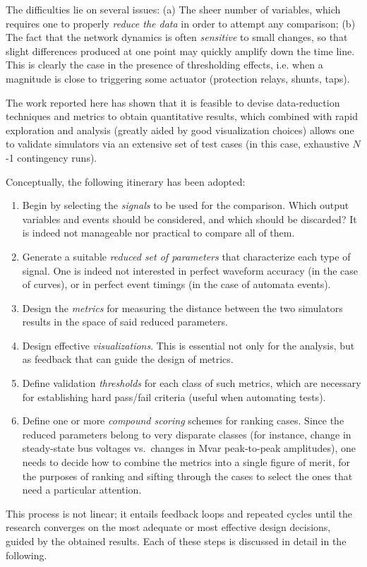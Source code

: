 \documentclass[conference]{IEEEtran}
\begin{document}
The difficulties lie on several issues: (a) The sheer number of variables, which
requires one to properly \emph{reduce the data} in order to attempt any
comparison; (b) The fact that the network dynamics is often \emph{sensitive} to
small changes, so that slight differences produced at one point may quickly
amplify down the time line. This is clearly the case in the presence of
thresholding effects, i.e. when a magnitude is close to triggering some actuator
(protection relays, shunts, taps).

The work reported here has shown that it is feasible to devise data-reduction
techniques and metrics to obtain quantitative results, which combined with rapid
exploration and analysis (greatly aided by good visualization choices) allows
one to validate simulators via an extensive set of test cases (in this case,
exhaustive $N$-1 contingency runs).

Conceptually, the following itinerary has been adopted:
\begin{enumerate}
  \item Begin by selecting the \emph{signals} to be
        used for the comparison. Which output variables and events should
        be considered, and which should be discarded? It is indeed
        not manageable nor practical to compare all of them.
  \item Generate a suitable \emph{reduced set of parameters} that characterize
        each type of signal. One is indeed not interested in perfect waveform
        accuracy (in the case of curves), or in perfect event timings (in the case
        of automata events).
  \item Design the \emph{metrics} for measuring the distance between the two
        simulators results in the space of said reduced parameters.
  \item Design effective \emph{visualizations}. This is essential not only
        for the analysis, but as feedback that can guide the design of
        metrics.
  \item Define validation \emph{thresholds} for each class of such
        metrics, which are necessary for establishing hard pass/fail
        criteria (useful when automating tests).
  \item Define one or more \emph{compound scoring} schemes for ranking
        cases. Since the reduced parameters belong to very disparate classes (for
        instance, change in steady-state bus voltages vs.\ changes in Mvar
        peak-to-peak amplitudes), one needs to decide how to combine the metrics
        into a single figure of merit, for the purposes of ranking and sifting
        through the cases to select the ones that need a particular attention.
\end{enumerate}
This process is not linear; it entails feedback loops and repeated cycles until
the research converges on the most adequate or most effective design decisions,
guided by the obtained results.  Each of these steps is discussed in detail in
the following.
\end{document}

